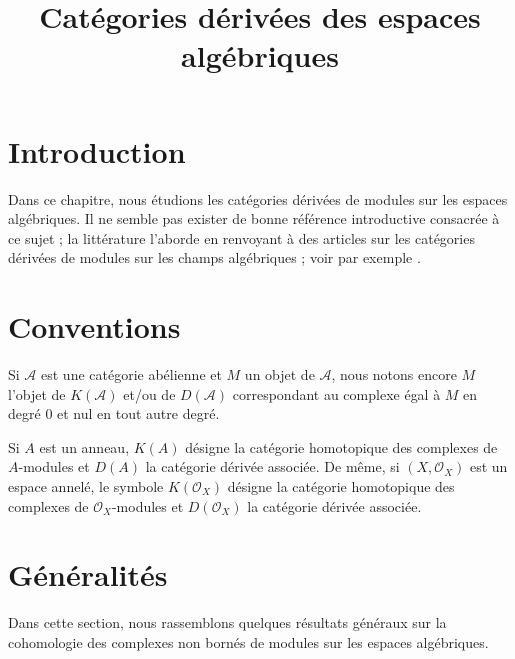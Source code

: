 

%


\title{Catégories dérivées des espaces algébriques}


\maketitle

\label{section-phantom}

\tableofcontents

\section{Introduction}
\label{section-introduction}

\noindent
Dans ce chapitre, nous étudions les catégories dérivées de modules sur les
espaces algébriques. Il ne semble pas exister de bonne référence introductive
consacrée à ce sujet ; la littérature l'aborde en renvoyant à des articles sur
les catégories dérivées de modules sur les champs algébriques ; voir par exemple
\cite{olsson_sheaves}.



\section{Conventions}
\label{section-conventions}

\noindent
Si $\mathcal{A}$ est une catégorie abélienne et $M$ un objet de
$\mathcal{A}$, nous notons encore $M$ l'objet de $K(\mathcal{A})$
et/ou de $D(\mathcal{A})$ correspondant au complexe égal à
$M$ en degré $0$ et nul en tout autre degré.

\medskip\noindent
Si $A$ est un anneau, $K(A)$ désigne la catégorie homotopique
des complexes de $A$-modules et $D(A)$ la catégorie dérivée associée.
De même, si $(X, \mathcal{O}_X)$ est un espace annelé, le symbole
$K(\mathcal{O}_X)$ désigne la catégorie homotopique des complexes de
$\mathcal{O}_X$-modules et $D(\mathcal{O}_X)$ la catégorie dérivée
associée.





\section{Généralités}
\label{section-generalities}

\noindent
Dans cette section, nous rassemblons quelques résultats généraux sur la
cohomologie des complexes non bornés de modules sur les espaces algébriques.

